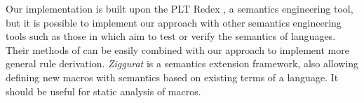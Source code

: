Our implementation is built upon the PLT Redex \cite{SEwPR}, a semantics engineering tool, but it is possible to implement our approach with other semantics engineering tools such as those in \cite{dynsem,Ksemantic} which aim to test or verify the semantics of languages. Their methods of can be easily combined with our approach to implement more general rule derivation. \emph{Ziggurat} \cite{Ziggurat} is a semantics extension framework, also allowing defining new macros with semantics based on existing terms of a language. It should be useful for static analysis of macros.

